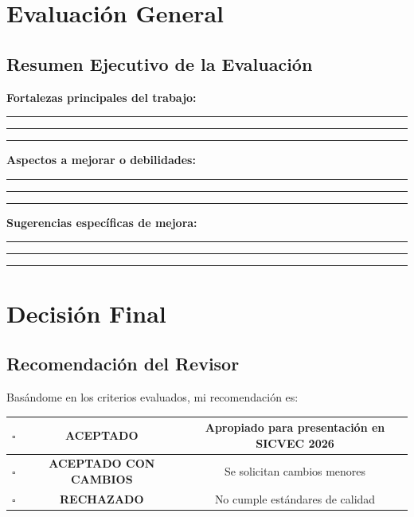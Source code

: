 \documentclass[12pt,a4paper]{article}
\begin{document}
\newpage

\section{Evaluación General}

\subsection*{Resumen Ejecutivo de la Evaluación}

\noindent
\textbf{Fortalezas principales del trabajo:}

\rule{16cm}{0.4pt}
\rule{16cm}{0.4pt}
\rule{16cm}{0.4pt}

\vspace{0.8cm}

\noindent
\textbf{Aspectos a mejorar o debilidades:}

\rule{16cm}{0.4pt}
\rule{16cm}{0.4pt}
\rule{16cm}{0.4pt}

\vspace{0.8cm}

\noindent
\textbf{Sugerencias específicas de mejora:}

\rule{16cm}{0.4pt}
\rule{16cm}{0.4pt}
\rule{16cm}{0.4pt}

\section{Decisión Final}

\subsection*{Recomendación del Revisor}

\noindent
Basándome en los criterios evaluados, mi recomendación es:

\vspace{0.8cm}

\begin{center}
\begin{tabular}{|c|c|c|}
\hline
\rowcolor{verde!30}
$\square$ & \textbf{ACEPTADO} & Apropiado para presentación en SICVEC 2026 \\
\hline
\rowcolor{amarillo!30}
$\square$ & \textbf{ACEPTADO CON CAMBIOS} & Se solicitan cambios menores \\
\hline
\rowcolor{rojo!30}
$\square$ & \textbf{RECHAZADO} & No cumple estándares de calidad \\
\hline
\end{tabular}
\end{center}
\end{document}
